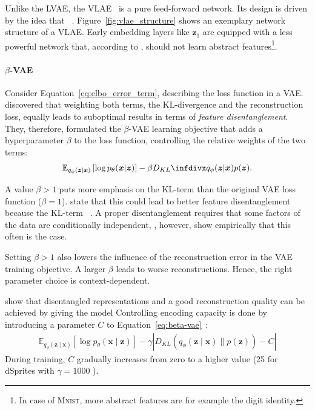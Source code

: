 Unlike the \ac{LVAE}, the \ac{VLAE}~\citep{zhao2017learning} is a pure feed-forward network.
Its design is driven by the idea that ~\citep{zhao2017learning}.
Figure~\ref{fig:vlae_structure} shows an exemplary network structure of a \ac{VLAE}.
Early embedding layers like $\bm{z}_1$ are equipped with a less powerful network that, according to \citet{zhao2017learning}, should not learn abstract features\footnote{In case of \textsc{Mnist}, more abstract features are for example the digit identity.}.

\paragraph{$\beta$-VAE}

Consider Equation~\ref{eq:elbo_error_term}, describing the loss function in a \ac{VAE}.
\citet{higgins2017beta} discovered that weighting both terms, the KL-divergence and the reconstruction loss, equally leads to suboptimal results in terms of \textit{feature disentanglement}.
They, therefore, formulated the $\beta$-VAE learning objective that adds a hyperparameter $\beta$ to the loss function, controlling the relative weights of the two terms:
\begin{align}
    \mathbb{E}_{q_{\phi}(\bm{z} | \bm{x})}\left[\log p_{\theta}(\bm{x} | \bm{z})\right]-\beta \kldiv{q_{\phi}(\bm{z} | \bm{x})}{p(\bm{z})}. \label{eq:beta-vae}
\end{align}

A value $\beta > 1$ puts more emphasis on the KL-term than the original \ac{VAE} loss function ($\beta = 1$).
\citet{higgins2017beta} state that this could lead to better feature disentanglement because the KL-term ~\citep{higgins2017beta}.
A proper disentanglement requires that some factors of the data are conditionally independent, \citet{higgins2017beta}, however, show empirically that this often is the case.

Setting $\beta > 1$ also lowers the influence of the reconstruction error in the \ac{VAE} training objective.
A larger $\beta$ leads to worse reconstructions.
Hence, the right parameter choice is context-dependent.

\citet{burgess2018understanding} show that disentangled representations and a good reconstruction quality can be achieved by giving the model 
Controlling encoding capacity is done by introducing a parameter $C$ to Equation~\ref{eq:beta-vae}~\citep{burgess2018understanding}:
\begin{align}
    \mathbb{E}_{q_{\phi}(\mathbf{z} \mid \bm{x})}\left[\log p_{\theta}(\bm{x} \mid \bm{z})\right]-\gamma\left|D_{K L}\left(q_{\phi}(\bm{z} \mid \bm{x}) \| p(\bm{z})\right)-C\right|
\end{align}
During training, $C$ gradually increases from zero to a higher value (25 for dSprites with $\gamma=1000$ \citep{burgess2018understanding}).

